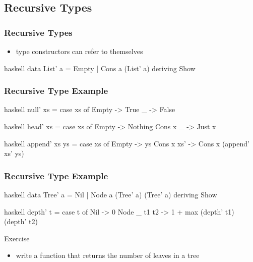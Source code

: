 \documentclass[dvipsnames]{beamer}
\theoremstyle{plain}
\begin{document}
\subsection{Recursive Types}

\begin{frame}[fragile]
  \frametitle{Recursive Types}

  \begin{itemize}
    \item type constructors can refer to themselves
  \end{itemize}

  \pause
  \begin{example}[Haskell]
    \begin{pygments}{haskell}
data List' a = Empty | Cons a (List' a)
               deriving Show
    \end{pygments}
  \end{example}
\end{frame}

\begin{frame}[fragile]
  \frametitle{Recursive Type Example}

  \begin{example}[Haskell]
    \begin{pygments}{haskell}
null' xs =
    case xs of
      Empty -> True
      _ -> False
    \end{pygments}

    \pause
    \smallskip
    \begin{pygments}{haskell}
head' xs =
    case xs of
      Empty -> Nothing
      Cons x _ -> Just x
    \end{pygments}

    \pause
    \smallskip
    \begin{pygments}{haskell}
append' xs ys =
    case xs of
      Empty -> ys
      Cons x xs' -> Cons x (append' xs' ys)
    \end{pygments}
  \end{example}
\end{frame}

\begin{frame}[fragile]
  \frametitle{Recursive Type Example}

  \begin{example}
    \begin{pygments}{haskell}
data Tree' a = Nil | Node a (Tree' a) (Tree' a)
               deriving Show
    \end{pygments}

    \pause
    \begin{pygments}{haskell}
depth' t =
    case t of
      Nil -> 0
      Node _ t1 t2 -> 1 + max (depth' t1) (depth' t2)
    \end{pygments}
  \end{example}

  \pause
  \begin{block}{Exercise}
    \begin{itemize}
      \item write a function that returns the number of leaves in a tree
    \end{itemize}
  \end{block}
\end{frame}
\end{document}
